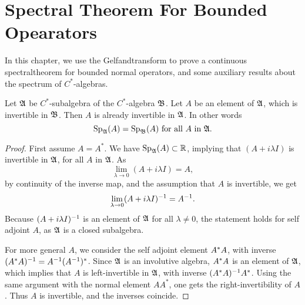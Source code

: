 
\section{Spectral Theorem For Bounded Opearators}
In this chapter, we use the Gelfandtransform to prove a continuous
spectraltheorem for bounded normal operators, and some auxiliary results
about the spectrum of $C^*$-algebras.
\begin{prop} \label{specinvariant}
 Let $\mathfrak{A}$ be $C^*$-subalgebra of the $C^*$-algebra
 $\mathfrak{B}$. 
 Let $A$ be an element of $\mathfrak{A}$, which is invertible in $\mathfrak{B}$.
 Then $A$ is already invertible in $\mathfrak{A}$. In other words 
\[
   \operatorname{Sp}_{\mathfrak{A}}(A) = \operatorname{Sp}_{\mathfrak{B}}(A) \text{ for all } A \text{ in } \mathfrak{A}.
\]

\end{prop}
\begin{proof}
 First assume $A = A^* $. We have $\operatorname{Sp}_{\mathfrak{A}}(A) \subset \mathbb{R}$, implying that
  $(A + i \lambda I)$  is invertible in  $\mathfrak{A}$, for all  $A$ in $\mathfrak{A}$.
  As 
 \[
  \lim_{\lambda \to 0} (A + i \lambda I) = A,
 \]
 by continuity of the inverse map, and the assumption that $A$ is invertible,
 we get
 \[
  \lim_{\lambda \to 0} (A + i \lambda I) ^{-1} =A ^{-1}.
 \]
Because $ (A + i \lambda I)^{-1}$ is an element of $\mathfrak{A}$ for all $\lambda \neq 0$, 
the statement  holds for self adjoint $A$, as $\mathfrak{A}$ is a closed subalgebra. 

For more general $A$, we consider the self adjoint element
$A^{*} A$, with inverse  $(A^{*} A)^{-1} = A^{-1} (A^{-1})^*$. 
Since $\mathfrak{A}$ is an involutive algebra, $A^{*} A$ is an element of $\mathfrak{A}$, which implies that
$A$ is left-invertible in $\mathfrak{A}$, with inverse $(A^{*} A)^{-1} A^*$.
Using the same argument with the normal element $AA^*$, one gets the
right-invertibility of $A$. Thus $A$ is invertible, and the
inverses coincide.
\end{proof}

